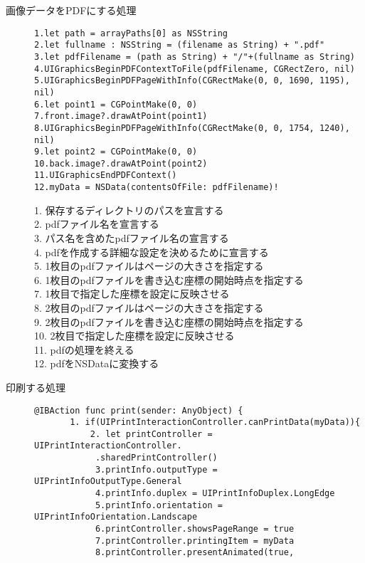 \begin{description}
\item[画像データをPDFにする処理]\mbox{} 
\begin{lstlisting}[basicstyle=\ttfamily\footnotesize, frame=single]
1.let path = arrayPaths[0] as NSString
2.let fullname : NSString = (filename as String) + ".pdf"
3.let pdfFilename = (path as String) + "/"+(fullname as String)
4.UIGraphicsBeginPDFContextToFile(pdfFilename, CGRectZero, nil)
5.UIGraphicsBeginPDFPageWithInfo(CGRectMake(0, 0, 1690, 1195), nil)
6.let point1 = CGPointMake(0, 0)
7.front.image?.drawAtPoint(point1)
8.UIGraphicsBeginPDFPageWithInfo(CGRectMake(0, 0, 1754, 1240), nil)
9.let point2 = CGPointMake(0, 0)
10.back.image?.drawAtPoint(point2)
11.UIGraphicsEndPDFContext()
12.myData = NSData(contentsOfFile: pdfFilename)!
 \end{lstlisting}
1. 保存するディレクトリのパスを宣言する\\
2. pdfファイル名を宣言する\\
3. パス名を含めたpdfファイル名の宣言する\\
4. pdfを作成する詳細な設定を決めるために宣言する\\
5. 1枚目のpdfファイルはページの大きさを指定する\\
6. 1枚目のpdfファイルを書き込む座標の開始時点を指定する\\
7. 1枚目で指定した座標を設定に反映させる\\
8. 2枚目のpdfファイルはページの大きさを指定する\\
9. 2枚目のpdfファイルを書き込む座標の開始時点を指定する\\
10. 2枚目で指定した座標を設定に反映させる\\
11. pdfの処理を終える\\
12. pdfをNSDataに変換する\\
\item[印刷する処理]\mbox{} 
\begin{lstlisting}[basicstyle=\ttfamily\footnotesize, frame=single]
@IBAction func print(sender: AnyObject) {
       1. if(UIPrintInteractionController.canPrintData(myData)){
           2. let printController = UIPrintInteractionController.
            .sharedPrintController()
            3.printInfo.outputType = UIPrintInfoOutputType.General
            4.printInfo.duplex = UIPrintInfoDuplex.LongEdge
            5.printInfo.orientation = UIPrintInfoOrientation.Landscape
            6.printController.showsPageRange = true
            7.printController.printingItem = myData
            8.printController.presentAnimated(true, 

\end{lstlisting}
\end{description}
